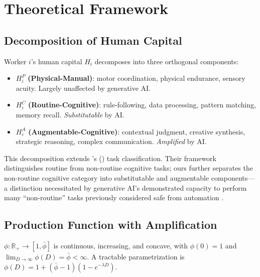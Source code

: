 \documentclass[a4paper,fleqn]{cas-dc}
\begin{document}
\section{Theoretical Framework}
\label{sec:theory}

\subsection{Decomposition of Human Capital}

\begin{definition}
Worker $i$'s human capital $H_i$ decomposes into three orthogonal components:
\begin{itemize}
\item $H_i^P$ \textbf{(Physical-Manual)}: motor coordination, physical endurance, sensory acuity. Largely unaffected by generative AI.
\item $H_i^C$ \textbf{(Routine-Cognitive)}: rule-following, data processing, pattern matching, memory recall. \textit{Substitutable} by AI.
\item $H_i^A$ \textbf{(Augmentable-Cognitive)}: contextual judgment, creative synthesis, strategic reasoning, complex communication. \textit{Amplified} by AI.
\end{itemize}
\end{definition}

This decomposition extends \citeauthor{autor2003skill}'s (\citeyear{autor2003skill}) task classification. Their framework distinguishes routine from non-routine cognitive tasks; ours further separates the non-routine cognitive category into substitutable and augmentable components---a distinction necessitated by generative AI's demonstrated capacity to perform many ``non-routine'' tasks previously considered safe from automation \citep{eloundou2024gpts}.

\subsection{Production Function with Amplification}

\begin{definition}
$\phi: \mathbb{R}_+ \to [1, \bar{\phi}]$ is continuous, increasing, and concave, with $\phi(0) = 1$ and $\lim_{D \to \infty} \phi(D) = \bar{\phi} < \infty$. A tractable parametrization is $\phi(D) = 1 + (\bar{\phi} - 1)(1 - e^{-\lambda D})$.
\end{definition}
\end{document}
